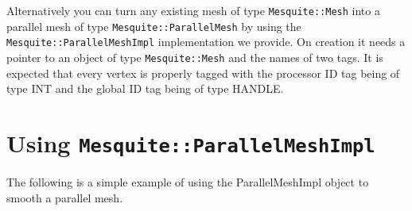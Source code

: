 Alternatively you can turn any existing mesh of type \texttt{Mesquite::Mesh} into a parallel mesh of type \texttt{Mesquite::ParallelMesh} by using the \texttt{Mesquite::ParallelMeshImpl} implementation we provide. On creation it needs a pointer to an object of type \texttt{Mesquite::Mesh} and the names of two tags. It is expected that every vertex is properly tagged with the processor ID tag being of type INT and the global ID tag being of type HANDLE.

\section{Using \texttt{Mesquite::ParallelMeshImpl}}

The following is a simple example of using the ParallelMeshImpl object to smooth a parallel mesh.

